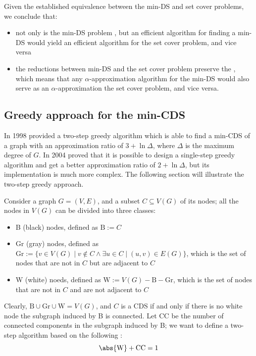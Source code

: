 \documentclass[a4paper, 12pt]{report}
\begin{document}
    Given the established equivalence between the min-DS and set cover problems, we conclude that:

    \begin{itemize}
        \item not only is the min-DS problem \NPComplete, but an efficient algorithm for finding a min-DS would yield an efficient algorithm for the set cover problem, and vice versa
        \item the reductions between min-DS and the set cover problem preserve the , which means that any $\alpha$-approximation algorithm for the min-DS would also serve as an $\alpha$-approximation the set cover problem, and vice versa.
    \end{itemize}

    \subsection{Greedy approach for the min-CDS}

    In 1998 \textcite{guha} provided a two-step greedy algorithm which is able to find a min-CDS of a graph with an approximation ratio of $3 + \ln \Delta$, where $\Delta$ is the maximum degree of $G$. In 2004 \textcite{ruan} proved that it is possible to design a single-step greedy algorithm and get a better approximation ratio of $2 + \ln \Delta$, but its implementation is much more complex. The following section will illustrate the two-step greedy approach.

    Consider a graph $G = (V, E)$, and a subset $C \subseteq V(G)$ of its nodes; all the nodes in $V(G)$ can be divided into three classes:

    \begin{itemize}
        \item B (black) nodes, defined as $\mathrm B := C$
        \item Gr (gray) nodes, defined as $\mathrm {Gr} := \{v \in V(G) \mid v \notin C \land \exists u \in C \mid (u, v) \in E(G)\}$, which is the set of nodes that are not in $C$ but are adjacent to $C$
        \item W (white) noeds, defined as $\mathrm W := V(G) - \mathrm B - \mathrm{Gr}$, which is the set of nodes that are not in $C$ and are not adjacent to $C$
    \end{itemize}

    Clearly, $\mathrm B \cup \mathrm{Gr} \cup \mathrm W = V(G)$, and $C$ is a CDS if and only if there is no white node  the subgraph induced by B is connected. Let CC be the number of connected components in the subgraph induced by B; we want to define a two-step algorithm based on the following : $$\abs {\mathrm W} + \mathrm{CC} = 1$$
\end{document}

